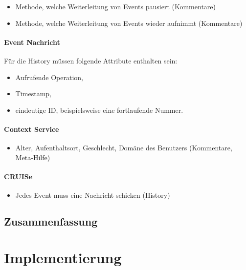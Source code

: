 \documentclass[
	headsepline,
	footsepline,
	fontsize=12pt,
	bibliography=totoc
]{scrbook}
\begin{document}
\begin{itemize}
	\item Methode, welche Weiterleitung von Events pausiert (Kommentare)
	\item Methode, welche Weiterleitung von Events wieder aufnimmt (Kommentare)
\end{itemize}

\subsubsection{Event Nachricht}

Für die History müssen folgende Attribute enthalten sein:

\begin{itemize}
	\item Aufrufende Operation,
	\item Timestamp,
	\item eindeutige ID, beispielsweise eine fortlaufende Nummer.
\end{itemize}

\subsubsection{Context Service}

\begin{itemize}
	\item Alter, Aufenthaltsort, Geschlecht, Domäne des Benutzers (Kommentare, Meta-Hilfe)
\end{itemize}

\subsubsection{CRUISe}

\begin{itemize}
	\item Jedes Event muss eine Nachricht schicken (History)
\end{itemize}

\section{Zusammenfassung}
\label{section:konzeption:zusammenfassung}

\chapter{Implementierung}
\label{chapter:implementierung}
\end{document}
